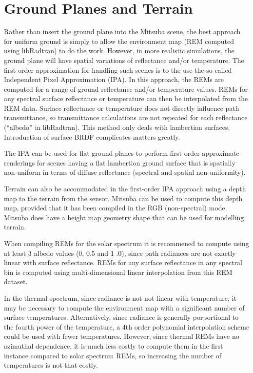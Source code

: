 \section{Ground Planes and Terrain}\label{ground-planes-and-terrain}

Rather than insert the ground plane into the Mitsuba scene, the best
approach for uniform ground is simply to allow the environment map (REM
computed using libRadtran) to do the work. However, in more realistic
simulations, the ground plane will have spatial variations of
reflectance and/or temperature. The first order approximation for
handling such scenes is to the use the so-called Independent Pixel
Approximation (IPA). In this approach, the REMs are computed for a range
of ground reflectance and/or temperature values. REMs for any spectral
surface reflectance or temperature can then be interpolated from the REM
data. Surface reflectance or temperature does not directly influence
path transmittance, so transmittance calculations are not repeated for
each reflectance (``albedo'' in libRadtran). This method only deals with
lambertian surfaces. Introduction of surface BRDF complicates matters
greatly.

The IPA can be used for flat ground planes to perform first order
approximate renderings for scenes having a flat lambertion ground
surface that is spatially non-uniform in terms of diffuse reflectance
(spectral and spatial non-uniformity).

Terrain can also be accommodated in the first-order IPA approach using a
depth map to the terrain from the sensor. Mitsuba can be used to compute
this depth map, provided that it has been compiled in the RGB
(non-spectral) mode. Mitsuba does have a height map geometry shape that
can be used for modelling terrain.

When compiling REMs for the solar spectrum it is recommened to compute
using at least 3 albedo values (0, 0.5 and 1 .0), since path radiances
are not exactly linear with surface reflectance. REMs for any surface
reflectance in any spectral bin is computed using multi-dimensional
linear interpolation from this REM dataset.

In the thermal spectrum, since radiance is not not linear with
temperature, it may be necessary to compute the environment map with a
significant number of surface temperatures. Alternatively, since
radiance is generally porportional to the fourth power of the
temperature, a 4th order polynomial interpolation scheme could be used
with fewer temperatures. However, since thermal REMs have no azimuthal
dependence, it is much less costly to compute them in the first instance
compared to solar spectrum REMs, so increasing the number of
temperatures is not that costly.

